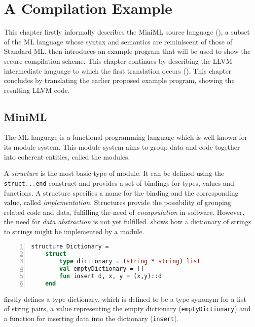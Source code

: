 \chapter{A Compilation Example}
\label{chap:ACompilationExample}
This chapter firstly informally describes the \mbox{MiniML} source language (), a subset of the ML language whose syntax and semantics are reminiscent of those of Standard ML.
 then introduces an example program that will be used to show the secure compilation scheme.
This chapter continues by describing the LLVM intermediate language to which the first translation occurs ().
This chapter concludes by translating the earlier proposed example program, showing the resulting LLVM code.

\section{MiniML}
\label{sec:MiniML}
The ML language is a functional programming language which is well known for its module system.
This module system aims to group data and code together into coherent entities, called the modules.

A \emph{structure} is the most basic type of module.
It can be defined using the \texttt{struct...end} construct and provides a set of bindings for types, values and functions.
A structure specifies a name for the binding and the corresponding value, called \emph{implementation}.
Structures provide the possibility of grouping related code and data, fulfilling the need of \emph{encapsulation} in software.
However, the need for \emph{data abstraction} is not yet fulfilled.
 shows how a dictionary of strings to strings might be implemented by a module.
~
\begin{lstlisting}[frame=single, language=ML,caption=An example structure showing the definition of a dictionary in ML, label=code:DictionaryStructureExample,numbers=left]
structure Dictionary =
    struct
        type dictionary = (string * string) list
        val emptyDictionary = []
        fun insert d, x, y = (x,y)::d
    end
\end{lstlisting}

 firstly defines a type dictionary, which is defined to be a type synonym for a list of string pairs, a value representing the empty dictionary (\texttt{emptyDictionary}) and a function for inserting data into the dictionary (\texttt{insert}).


